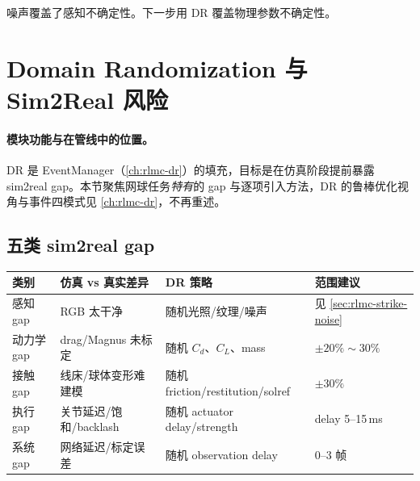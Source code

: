 \begin{practice}[本节动手任务]
\end{practice}

\noindent{}噪声覆盖了感知不确定性。下一步用 DR 覆盖物理参数不确定性。

\section{Domain Randomization 与 Sim2Real 风险}
\label{sec:rlmc-strike-dr}

\paragraph{模块功能与在管线中的位置。}DR 是 EventManager（\cref{ch:rlmc-dr}）的填充，目标是在仿真阶段提前暴露 sim2real gap。本节聚焦网球任务\emph{特有}的 gap 与逐项引入方法，DR 的鲁棒优化视角与事件四模式见 \cref{ch:rlmc-dr}，不再重述。

\subsection{五类 sim2real gap}

\begin{center}
\small
\begin{tabular}{@{}llll@{}}
\toprule
类别 & 仿真 vs 真实差异 & DR 策略 & 范围建议 \\
\midrule
感知 gap & RGB 太干净 & 随机光照/纹理/噪声 & 见 \cref{sec:rlmc-strike-noise} \\
动力学 gap & drag/Magnus 未标定 & 随机 $C_d$、$C_L$、mass & $\pm 20\%\sim30\%$ \\
接触 gap & 线床/球体变形难建模 & 随机 friction/restitution/solref & $\pm 30\%$ \\
执行 gap & 关节延迟/饱和/backlash & 随机 actuator delay/strength & delay 5--15\,ms \\
系统 gap & 网络延迟/标定误差 & 随机 observation delay & 0--3 帧 \\
\bottomrule
\end{tabular}
\end{center}

